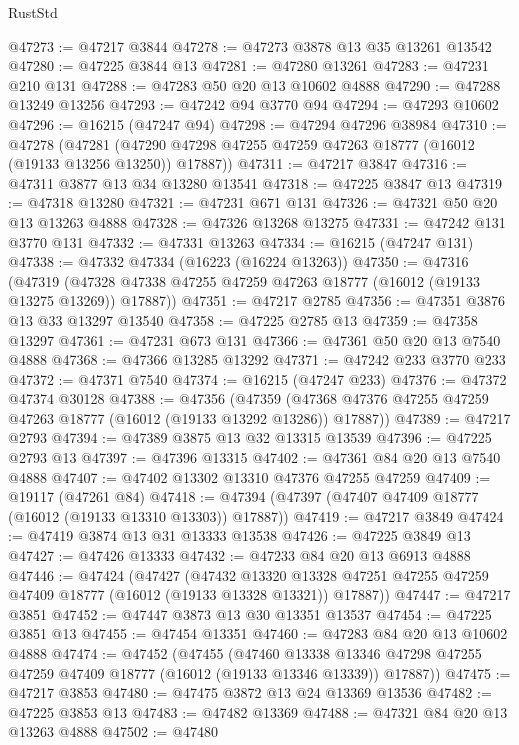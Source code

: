 \begin{lexlean}{RustStd}
\begin{coremodule}
@47273 := @47217 @3844
@47278 := @47273 @3878 @13 @35 @13261 @13542
@47280 := @47225 @3844 @13
@47281 := @47280 @13261
@47283 := @47231 @210 @131
@47288 := @47283 @50 @20 @13 @10602 @4888
@47290 := @47288 @13249 @13256
@47293 := @47242 @94 @3770 @94
@47294 := @47293 @10602
@47296 := @16215 (@47247 @94)
@47298 := @47294 @47296 @38984
@47310 := @47278
    (@47281 (@47290 @47298 @47255 @47259 @47263 @18777 (@16012 (@19133 @13256 @13250)) @17887))
@47311 := @47217 @3847
@47316 := @47311 @3877 @13 @34 @13280 @13541
@47318 := @47225 @3847 @13
@47319 := @47318 @13280
@47321 := @47231 @671 @131
@47326 := @47321 @50 @20 @13 @13263 @4888
@47328 := @47326 @13268 @13275
@47331 := @47242 @131 @3770 @131
@47332 := @47331 @13263
@47334 := @16215 (@47247 @131)
@47338 := @47332 @47334 (@16223 (@16224 @13263))
@47350 := @47316
    (@47319 (@47328 @47338 @47255 @47259 @47263 @18777 (@16012 (@19133 @13275 @13269)) @17887))
@47351 := @47217 @2785
@47356 := @47351 @3876 @13 @33 @13297 @13540
@47358 := @47225 @2785 @13
@47359 := @47358 @13297
@47361 := @47231 @673 @131
@47366 := @47361 @50 @20 @13 @7540 @4888
@47368 := @47366 @13285 @13292
@47371 := @47242 @233 @3770 @233
@47372 := @47371 @7540
@47374 := @16215 (@47247 @233)
@47376 := @47372 @47374 @30128
@47388 := @47356
    (@47359 (@47368 @47376 @47255 @47259 @47263 @18777 (@16012 (@19133 @13292 @13286)) @17887))
@47389 := @47217 @2793
@47394 := @47389 @3875 @13 @32 @13315 @13539
@47396 := @47225 @2793 @13
@47397 := @47396 @13315
@47402 := @47361 @84 @20 @13 @7540 @4888
@47407 := @47402 @13302 @13310 @47376 @47255 @47259
@47409 := @19117 (@47261 @84)
@47418 := @47394 (@47397 (@47407 @47409 @18777 (@16012 (@19133 @13310 @13303)) @17887))
@47419 := @47217 @3849
@47424 := @47419 @3874 @13 @31 @13333 @13538
@47426 := @47225 @3849 @13
@47427 := @47426 @13333
@47432 := @47233 @84 @20 @13 @6913 @4888
@47446 := @47424
    (@47427
      (@47432
        @13320
        @13328
        @47251
        @47255
        @47259
        @47409
        @18777
        (@16012 (@19133 @13328 @13321))
        @17887))
@47447 := @47217 @3851
@47452 := @47447 @3873 @13 @30 @13351 @13537
@47454 := @47225 @3851 @13
@47455 := @47454 @13351
@47460 := @47283 @84 @20 @13 @10602 @4888
@47474 := @47452
    (@47455
      (@47460
        @13338
        @13346
        @47298
        @47255
        @47259
        @47409
        @18777
        (@16012 (@19133 @13346 @13339))
        @17887))
@47475 := @47217 @3853
@47480 := @47475 @3872 @13 @24 @13369 @13536
@47482 := @47225 @3853 @13
@47483 := @47482 @13369
@47488 := @47321 @84 @20 @13 @13263 @4888
@47502 := @47480

\end{coremodule}
\end{lexlean}
